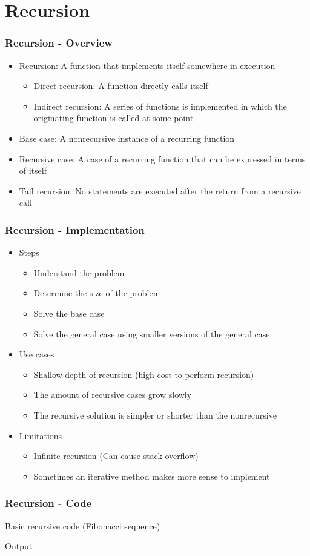 \section{Recursion}
\begin{frame}\frametitle{Recursion - Overview}
\begin{itemize}
\item Recursion: A function that implements itself somewhere in execution
	\begin{itemize}
	\item Direct recursion: A function directly calls itself
	\item Indirect recursion: A series of functions is implemented in which the originating function is called at some point
	\end{itemize}
\item Base case: A nonrecursive instance of a recurring function
\item Recursive case: A case of a recurring function that can be expressed in terms of itself
\item Tail recursion: No statements are executed after the return from a recursive call
\end{itemize}
\end{frame}

\begin{frame}\frametitle{Recursion - Implementation}
\begin{itemize}
\item Steps
	\begin{itemize}
	\item Understand the problem
	\item Determine the size of the problem
	\item Solve the base case
	\item Solve the general case using smaller versions of the general case
	\end{itemize}
\item Use cases
	\begin{itemize}
	\item Shallow depth of recursion (high cost to perform recursion)
	\item The amount of recursive cases grow slowly
	\item The recursive solution is simpler or shorter than the nonrecursive
	\end{itemize}
\item Limitations
	\begin{itemize}
	\item Infinite recursion (Can cause stack overflow)
	\item Sometimes an iterative method makes more sense to implement
	\end{itemize}
\end{itemize}
\end{frame}

\begin{frame}\frametitle{Recursion - Code}
Basic recursive code (Fibonacci sequence)

Output

\end{frame}

